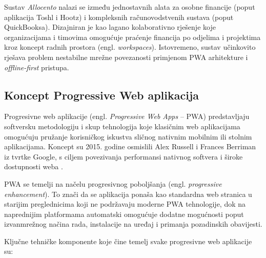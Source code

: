\documentclass[a4paper,12pt,oneside]{article}
\begin{document}
	Sustav \textit{Allocento} nalazi se između jednostavnih alata za osobne financije (poput aplikacija Toshl i Hootz) i kompleksnih računovodstvenih sustava (poput QuickBooksa). Dizajniran je kao lagano kolaborativno rješenje koje organizacijama i timovima omogućuje praćenje financija po odjelima i projektima kroz koncept radnih prostora (engl. \textit{workspaces}). Istovremeno, sustav učinkovito rješava problem nestabilne mrežne povezanosti primjenom PWA arhitekture i \textit{offline-first} pristupa.
	
	\newpage
	
	\subsection{Koncept Progressive Web aplikacija}
	
	Progresivne web aplikacije (engl. \textit{Progressive Web Apps} – PWA) predstavljaju softversku metodologiju i skup tehnologija koje klasičnim web aplikacijama omogućuju pružanje korisničkog iskustva sličnog nativnim mobilnim ili stolnim aplikacijama. Koncept su 2015. godine osmislili Alex Russell i Frances Berriman iz tvrtke Google, s ciljem povezivanja performansi nativnog softvera i široke dostupnosti weba \cite{w_pwa_alex_russell}.
	
	PWA se temelji na načelu progresivnog poboljšanja (engl. \textit{progressive enhancement}). To znači da se aplikacija ponaša kao standardna web stranica u starijim preglednicima koji ne podržavaju moderne PWA tehnologije, dok na naprednijim platformama automatski omogućuje dodatne mogućnosti poput izvanmrežnog načina rada, instalacije na uređaj i primanja pozadinskih obavijesti.
	
	Ključne tehničke komponente koje čine temelj svake progresivne web aplikacije su:
	
\end{document}
